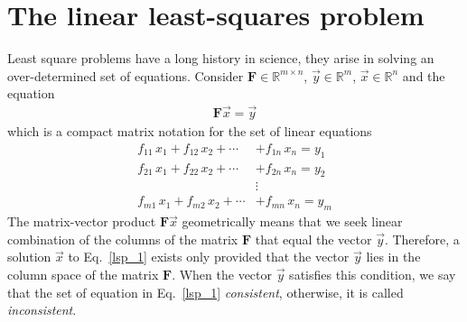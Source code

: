 \documentclass[11pt,a4paper,oneside]{book}
\numberwithin{equation}{section}
\theoremstyle{it}
\theoremstyle{definition}
\begin{document}
\section{The linear least-squares problem}
Least square problems have a long history in science, they arise in solving an 
over-determined set of equations. Consider $\mathbf{F}\in\mathbb{R}^{m\times 
n}$, $\vec{y}\in\mathbb{R}^{m}$, $\vec{x}\in\mathbb{R}^{n}$ and the equation
\begin{equation}\label{lsp_1}
	\begin{aligned}
		\mathbf{F}\vec{x}=\vec{y}
	\end{aligned}
\end{equation} 
which is a compact matrix notation for the set of linear equations
\begin{equation*}
	\begin{aligned}
		f_{11}\,x_1+f_{12}\,x_2+\cdots&+f_{1n}\,x_n = y_1 \\[6pt]
		f_{21}\,x_1+f_{22}\,x_2+\cdots&+f_{2n}\,x_n = y_2 \\[6pt]
		&\vdots \\[6pt]
		f_{m1}\,x_1+f_{m2}\,x_2+\cdots&+f_{mn}\,x_n = y_m
	\end{aligned}
\end{equation*} 
The matrix-vector product $\mathbf{F}\vec{x}$ geometrically means that we seek 
linear combination of the columns of the matrix $\mathbf{F}$ that equal the 
vector $\vec{y}$. Therefore, a solution $\vec{x}$ to Eq.~\eqref{lsp_1} exists 
only provided that the vector $\vec{y}$ lies in the column space of the matrix 
$\mathbf{F}$. When the vector $\vec{y}$ satisfies this condition, we say that 
the set of equation in Eq.~\eqref{lsp_1} \textit{consistent}, otherwise, it is 
called \textit{inconsistent}.
\end{document}

